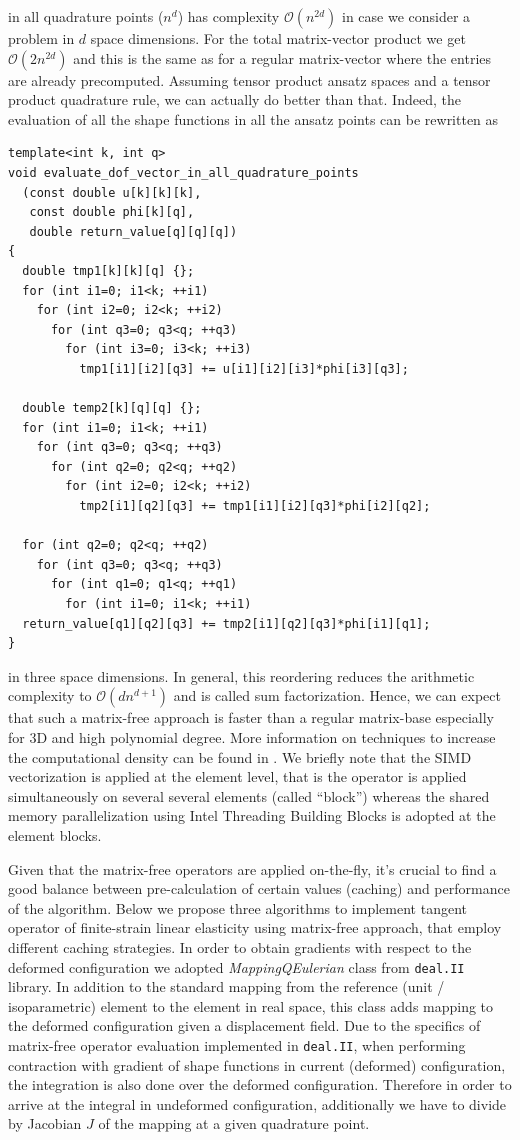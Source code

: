 \documentclass[preprint,12pt,times]{elsarticle}
\begin{document}
in all quadrature points ($n^d$) has complexity $\mathcal{O}(n^{2d})$ in case we consider a problem in $d$ space dimensions. For the total matrix-vector product we get $\mathcal{O}(2n^{2d})$
and this is the same as for a regular matrix-vector where the entries are already precomputed. Assuming tensor product ansatz spaces and a tensor product quadrature rule, we can actually do better
than that. Indeed, the evaluation of all the shape functions in all the ansatz points can be rewritten as
\begin{lstlisting}
template<int k, int q>
void evaluate_dof_vector_in_all_quadrature_points
  (const double u[k][k][k],
   const double phi[k][q],
   double return_value[q][q][q])
{
  double tmp1[k][k][q] {};
  for (int i1=0; i1<k; ++i1)
    for (int i2=0; i2<k; ++i2)
      for (int q3=0; q3<q; ++q3)
        for (int i3=0; i3<k; ++i3)
          tmp1[i1][i2][q3] += u[i1][i2][i3]*phi[i3][q3];

  double temp2[k][q][q] {};
  for (int i1=0; i1<k; ++i1)
    for (int q3=0; q3<q; ++q3)
      for (int q2=0; q2<q; ++q2)
        for (int i2=0; i2<k; ++i2)
          tmp2[i1][q2][q3] += tmp1[i1][i2][q3]*phi[i2][q2];

  for (int q2=0; q2<q; ++q2)
    for (int q3=0; q3<q; ++q3)
      for (int q1=0; q1<q; ++q1)
        for (int i1=0; i1<k; ++i1)
  return_value[q1][q2][q3] += tmp2[i1][q2][q3]*phi[i1][q1];
}
\end{lstlisting}
in three space dimensions. In general, this reordering reduces the arithmetic complexity to $\mathcal{O}(dn^{d+1})$ and is called sum factorization.
Hence, we can expect that such a matrix-free approach is faster than a regular matrix-base especially for 3D and high polynomial degree.
More information on techniques to increase the computational density can be found in \cite{kronbichler12,vos10}.
We briefly note that the SIMD vectorization is applied at the element level, that is the operator is applied simultaneously on several several elements (called ``block'') whereas the shared memory parallelization using Intel Threading Building Blocks is adopted at the element blocks.

Given that the matrix-free operators are applied on-the-fly, it's crucial to find a good balance between pre-calculation of certain values (caching) and performance of the algorithm.
Below we propose three algorithms to implement tangent operator of finite-strain linear elasticity using matrix-free approach, that employ different caching strategies.
%
In order to obtain gradients with respect to the deformed configuration we adopted \textit{MappingQEulerian} class from \texttt{deal.II} library.
In addition to the standard mapping from the reference (unit / isoparametric) element to the element in real space, this class adds mapping to the deformed configuration given a displacement field.
%
Due to the specifics of matrix-free operator evaluation implemented in \texttt{deal.II}, when performing contraction with gradient of shape functions in current (deformed) configuration, the integration is also done over the deformed configuration. Therefore in order to arrive at the integral in undeformed configuration, additionally we have to divide by Jacobian $J$ of the mapping at a given quadrature point.
\end{document}
